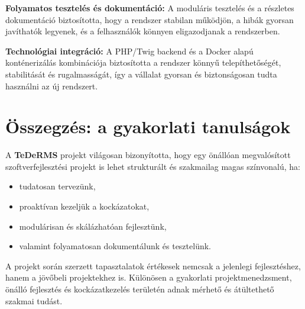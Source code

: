 \textbf{Folyamatos tesztelés és dokumentáció:}  
A moduláris tesztelés és a részletes dokumentáció biztosította, hogy a rendszer stabilan működjön, 
a hibák gyorsan javíthatók legyenek, és a felhasználók könnyen eligazodjanak a rendszerben.

\textbf{Technológiai integráció:}  
A PHP/Twig backend és a Docker alapú konténerizálás kombinációja biztosította a rendszer könnyű telepíthetőségét, 
stabilitását és rugalmasságát, így a vállalat gyorsan és biztonságosan tudta használni az új rendszert.

\section{Összegzés: a gyakorlati tanulságok}

A \textbf{TeDeRMS} projekt világosan bizonyította, hogy egy önállóan megvalósított szoftverfejlesztési projekt is lehet 
strukturált és szakmailag magas színvonalú, ha:
\begin{itemize}
    \item tudatosan tervezünk,
    \item proaktívan kezeljük a kockázatokat,
    \item modulárisan és skálázhatóan fejlesztünk,
    \item valamint folyamatosan dokumentálunk és tesztelünk.
\end{itemize}

A projekt során szerzett tapasztalatok értékesek nemcsak a jelenlegi fejlesztéshez, 
hanem a jövőbeli projektekhez is. 
Különösen a gyakorlati projektmenedzsment, önálló fejlesztés és kockázatkezelés területén adnak mérhető és átültethető szakmai tudást.
